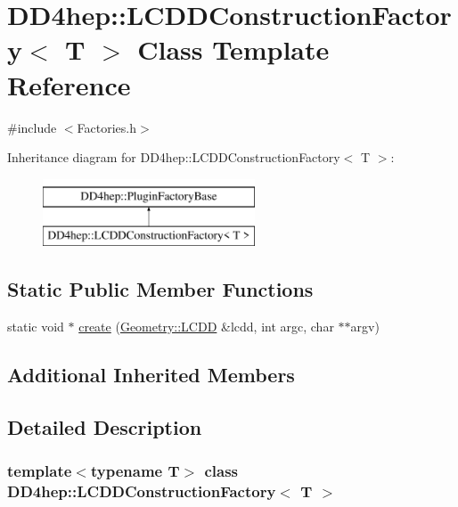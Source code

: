 \hypertarget{class_d_d4hep_1_1_l_c_d_d_construction_factory}{}\section{D\+D4hep\+:\+:L\+C\+D\+D\+Construction\+Factory$<$ T $>$ Class Template Reference}
\label{class_d_d4hep_1_1_l_c_d_d_construction_factory}


{\ttfamily \#include $<$Factories.\+h$>$}

Inheritance diagram for D\+D4hep\+:\+:L\+C\+D\+D\+Construction\+Factory$<$ T $>$\+:\begin{figure}[H]
\begin{center}
\leavevmode
\includegraphics[height=2.000000cm]{class_d_d4hep_1_1_l_c_d_d_construction_factory}
\end{center}
\end{figure}
\subsection*{Static Public Member Functions}
\begin{DoxyCompactItemize}
\item 
static void $\ast$ \hyperlink{class_d_d4hep_1_1_l_c_d_d_construction_factory_aa6fda027eb3dbfc490d9daad93ea18a0}{create} (\hyperlink{class_d_d4hep_1_1_geometry_1_1_l_c_d_d}{Geometry\+::\+L\+C\+DD} \&lcdd, int argc, char $\ast$$\ast$argv)
\end{DoxyCompactItemize}
\subsection*{Additional Inherited Members}


\subsection{Detailed Description}
\subsubsection*{template$<$typename T$>$\newline
class D\+D4hep\+::\+L\+C\+D\+D\+Construction\+Factory$<$ T $>$}



